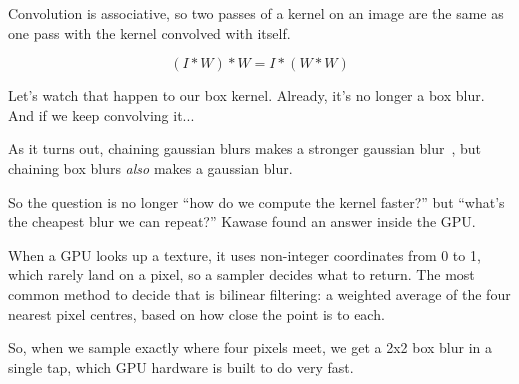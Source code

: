 \documentclass{article}
\begin{document}
Convolution is associative, so two passes of a kernel on an image are the same as one pass with the kernel convolved with itself.

\[
    (I * W) * W = I * (W * W)
\]

Let's watch that happen to our box kernel. Already, it's no longer a box blur. And if we keep convolving it...


As it turns out, chaining gaussian blurs makes a stronger gaussian blur~\cite{web:wikipedia-gaussian-blur}, but chaining box blurs \textit{also} makes a gaussian blur.

So the question is no longer ``how do we compute the kernel faster?'' but ``what's the cheapest blur we can repeat?'' Kawase found an answer inside the GPU.

When a GPU looks up a texture, it uses non-integer coordinates from 0 to 1, which rarely land on a pixel, so a sampler decides what to return. The most common method to decide that is bilinear filtering: a weighted average of the four nearest pixel centres, based on how close the point is to each.

So, when we sample exactly where four pixels meet, we get a 2x2 box blur in a single tap, which GPU hardware is built to do very fast.
\end{document}
